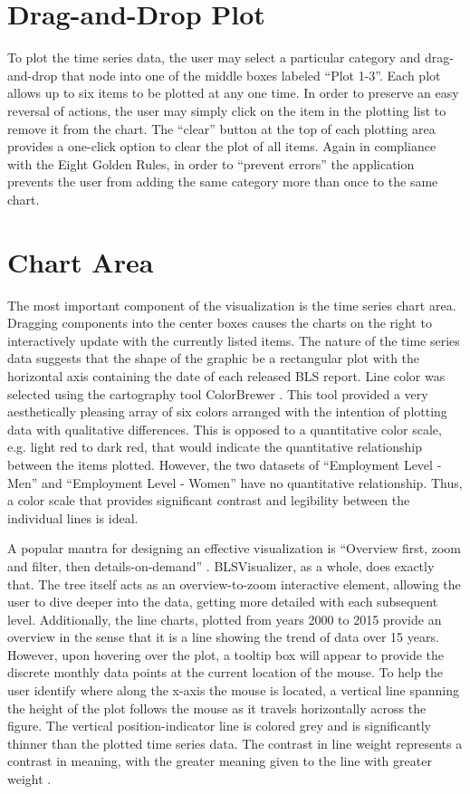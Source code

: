 \documentclass{sigchi}
\begin{document}
{\section{Drag-and-Drop Plot}

To plot the time series data, the user may select a particular category and drag-and-drop that node into one of the middle boxes labeled ``Plot 1-3''. Each plot allows up to six items to be plotted at any one time. In order to preserve an easy reversal of actions, the user may simply click on the item in the plotting list to remove it from the chart. The ``clear'' button at the top of each plotting area provides a one-click option to clear the plot of all items. Again in compliance with the Eight Golden Rules, in order to ``prevent errors'' the application prevents the user from adding the same category more than once to the same chart.

\section{Chart Area}

The most important component of the visualization is the time series chart area. Dragging components into the center boxes causes the charts on the right to interactively update with the currently listed items. The nature of the time series data suggests that the shape of the graphic be a rectangular plot with the horizontal axis containing the date of each released BLS report. Line color was selected using the cartography tool ColorBrewer \cite{Harrower2003}. This tool provided a very aesthetically pleasing array of six colors arranged with the intention of plotting data with qualitative differences. This is opposed to a quantitative color scale, e.g. light red to dark red, that would indicate the quantitative relationship between the items plotted. However, the two datasets of ``Employment Level - Men'' and ``Employment Level - Women'' have no quantitative relationship. Thus, a color scale that provides significant contrast and legibility between the individual lines is ideal.

A popular mantra for designing an effective visualization is ``Overview first, zoom and filter, then details-on-demand'' \cite{Shneiderman1996}. BLSVisualizer, as a whole, does exactly that. The tree itself acts as an overview-to-zoom interactive element, allowing the user to dive deeper into the data, getting more detailed with each subsequent level. Additionally, the line charts, plotted from years 2000 to 2015 provide an overview in the sense that it is a line showing the trend of data over 15 years. However, upon hovering over the plot, a tooltip box will appear to provide the discrete monthly data points at the current location of the mouse. To help the user identify where along the x-axis the mouse is located, a vertical line spanning the height of the plot follows the mouse as it travels horizontally across the figure. The vertical position-indicator line is colored grey and is significantly thinner than the plotted time series data. The contrast in line weight represents a contrast in meaning, with the greater meaning given to the line with greater weight \cite{Tufte}.

}
\end{document}
